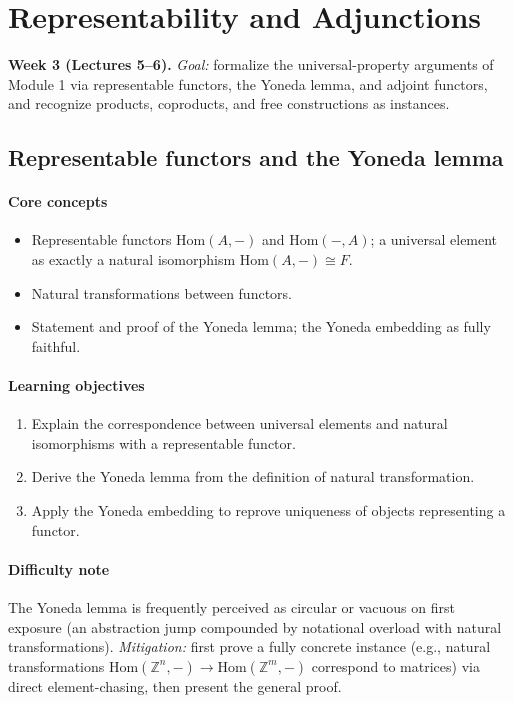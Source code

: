 \documentclass{article}
\begin{document}
\section{Representability and Adjunctions}
\textbf{Week 3 (Lectures 5--6).} \emph{Goal:} formalize the universal-property arguments of Module 1 via representable functors, the Yoneda lemma, and adjoint functors, and recognize products, coproducts, and free constructions as instances.

\subsection{Representable functors and the Yoneda lemma}
\paragraph{Core concepts}
\begin{itemize}[nosep]
  \item Representable functors $\mathrm{Hom}(A,-)$ and $\mathrm{Hom}(-,A)$; a universal element as exactly a natural isomorphism $\mathrm{Hom}(A,-) \cong F$.
  \item Natural transformations between functors.
  \item Statement and proof of the Yoneda lemma; the Yoneda embedding as fully faithful.
\end{itemize}
\paragraph{Learning objectives}
\begin{enumerate}[nosep]
  \item Explain the correspondence between universal elements and natural isomorphisms with a representable functor.
  \item Derive the Yoneda lemma from the definition of natural transformation.
  \item Apply the Yoneda embedding to reprove uniqueness of objects representing a functor.
\end{enumerate}
\paragraph{Difficulty note}
The Yoneda lemma is frequently perceived as circular or vacuous on first exposure (an abstraction jump compounded by notational overload with natural transformations). \emph{Mitigation:} first prove a fully concrete instance (e.g., natural transformations $\mathrm{Hom}(\mathbb{Z}^n,-) \to \mathrm{Hom}(\mathbb{Z}^m,-)$ correspond to matrices) via direct element-chasing, then present the general proof.
\end{document}
